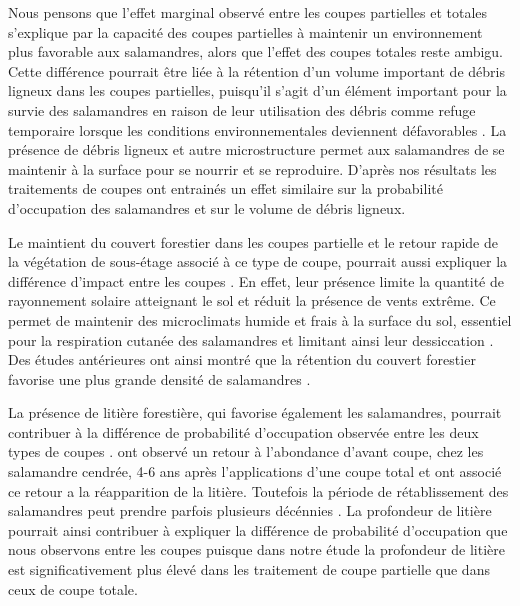 Nous pensons que l'effet marginal observé entre les coupes partielles et totales s'explique par la capacité des coupes partielles à maintenir un environnement plus favorable aux salamandres, 
alors que l'effet des coupes totales reste ambigu. 
Cette différence pourrait être liée à la rétention d'un volume important de débris ligneux dans les coupes partielles, 
puisqu'il s'agit d'un élément important pour la survie des salamandres en raison de leur utilisation des débris comme refuge temporaire lorsque les conditions environnementales deviennent défavorables \citep{Nolet2018Comparingeffects,Peterman2014Spatialvariation,Achat2015Quantifyingconsequences,Peele2017Effectswoody}.
La présence de débris ligneux et autre microstructure permet aux salamandres de se maintenir à la surface pour se nourrir et se reproduire. 
D'après nos résultats les traitements de coupes ont entrainés un effet similaire sur la probabilité d'occupation des salamandres et sur le volume de débris ligneux.

Le maintient du couvert forestier dans les coupes partielle et le retour rapide de la végétation de sous-étage associé à ce type de coupe, pourrait aussi expliquer la différence d'impact entre les coupes \citep{Raybuck2015silviculturalpractices}.
En effet, leur présence limite la quantité de rayonnement solaire atteignant le sol et réduit la présence de vents extrême. 
Ce permet de maintenir des microclimats humide et frais à la surface du sol, essentiel pour la respiration cutanée des salamandres et limitant ainsi leur dessiccation \citep{Homyack2011Energeticssurface}. 
Des études antérieures ont ainsi montré que la rétention du couvert forestier favorise une plus grande densité de salamandres \citep{Hocking2013Effectsexperimental,Harper2015Impactforestry,Mahoney2016Woodlandsalamander}. 

La présence de litière forestière, qui favorise également les salamandres, pourrait contribuer à la différence de probabilité d'occupation observée entre les deux types de coupes \citep{tilghmanMetaanalysisEffectsCanopy2012}.
\cite{Ash1997DisappearanceReturn} ont observé un retour à l'abondance d'avant coupe, chez les salamandre cendrée, 4-6 ans après l'applications d'une coupe total et ont associé ce retour a la réapparition de la litière. 
Toutefois la période de rétablissement des salamandres peut prendre parfois plusieurs décénnies \citep{Homyack2013Effectsrepeatedstand,Ochs2022Responseterrestrial}. 
La profondeur de litière pourrait ainsi contribuer à expliquer la différence de probabilité d'occupation que nous observons entre les coupes puisque dans notre étude la profondeur de litière est significativement plus élevé dans les traitement de coupe partielle que dans ceux de coupe totale.

